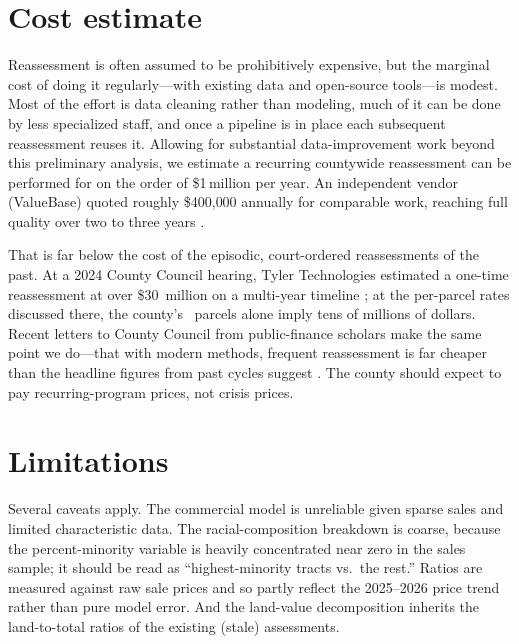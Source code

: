 \documentclass[11pt]{article}
\begin{document}
\begin{table}[htbp]\centering
\caption{Data-quality audit: county values vs.\ independent references (\auditSampleN-parcel sample).}
\label{tab:audit}

\end{table}

\section{Cost estimate}\label{sec:cost}
Reassessment is often assumed to be prohibitively expensive, but the marginal cost
of doing it regularly---with existing data and open-source tools---is modest. Most
of the effort is data cleaning rather than modeling, much of it can be done by less
specialized staff, and once a pipeline is in place each subsequent reassessment
reuses it. Allowing for substantial data-improvement work beyond this preliminary
analysis, we estimate a recurring countywide reassessment can be performed for on
the order of \$1\,million per year. An independent vendor (ValueBase) quoted
roughly \$400{,}000 annually for comparable work, reaching full quality over two to
three years \citep{parkinson2024}.

That is far below the cost of the episodic, court-ordered reassessments of the
past. At a 2024 County Council hearing, Tyler Technologies estimated a one-time
reassessment at over \$30~million on a multi-year timeline \citep{council_tv2024};
at the per-parcel rates discussed there, the county's \totalParcels\ parcels alone
imply tens of millions of dollars. Recent letters to County Council from
public-finance scholars make the same point we do---that with modern methods,
frequent reassessment is far cheaper than the headline figures from past cycles
suggest \citep{anderson2026,skidmore2026,briem2022}. The county should expect to
pay recurring-program prices, not crisis prices.

\section{Limitations}
Several caveats apply. The commercial model is unreliable given sparse sales and
limited characteristic data. The racial-composition breakdown is coarse, because
the percent-minority variable is heavily concentrated near zero in the sales
sample; it should be read as ``highest-minority tracts vs.\ the rest.'' Ratios
are measured against raw sale prices and so partly reflect the 2025--2026 price
trend rather than pure model error. And the land-value decomposition inherits the
land-to-total ratios of the existing (stale) assessments.
\end{document}
